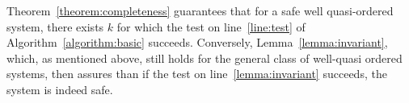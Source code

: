 %
%
Theorem~\ref{theorem:completeness} guarantees that for a safe well
quasi-ordered system, there exists $k$ for which the test on
line~\ref{line:test} of Algorithm~\ref{algorithm:basic} succeeds.
%
Conversely, Lemma~\ref{lemma:invariant}, which, as mentioned above,
still holds for the general class of well-quasi ordered systems, then
assures than if the test on line~\ref{lemma:invariant} succeeds, the
system is indeed safe.

